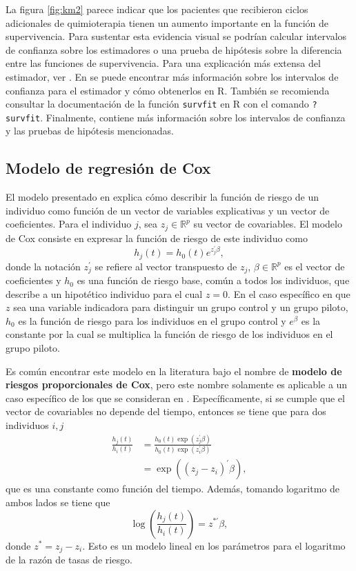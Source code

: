 \documentclass[11pt,a4paper]{article}
\begin{document}
La figura \ref{fig:km2} parece indicar que los pacientes que recibieron ciclos adicionales de quimioterapia tienen un aumento importante en la función de supervivencia. Para sustentar esta evidencia visual se podrían calcular intervalos de confianza sobre los estimadores o una prueba de hipótesis sobre la diferencia entre las funciones de supervivencia. Para una explicación más extensa del estimador, ver \citet{kaplan-meier}. En \citet{moore} se puede encontrar más información sobre los intervalos de confianza para el estimador y cómo obtenerlos en R. También se recomienda consultar la documentación de la función \texttt{survfit} en R con el comando \texttt{?survfit}. Finalmente, \citet{klein} contiene más información sobre los intervalos de confianza y las pruebas de hipótesis mencionadas.

\subsection{Modelo de regresión de Cox}
\label{seccion_coxph}
El modelo presentado en \citet{cox} explica cómo describir la función de riesgo de un individuo como función de un vector de variables explicativas y un vector de coeficientes. Para el individuo $j$, sea $z_j\in \mathbb{R}^p$ su vector de covariables. El modelo de Cox consiste en expresar la función de riesgo de este individuo como
\begin{equation} \label{cox_ph}
h_j(t) = h_0(t)e^{z_j^\prime \beta},
\end{equation}
donde la notación $z_j^\prime$ se refiere al vector transpuesto de $z_j$, $\beta\in \mathbb{R}^p$ es el vector de coeficientes y $h_0$ es una función de riesgo base, común a todos los individuos, que describe a un hipotético individuo para el cual $z = 0$. En el caso específico en que $z$ sea una variable indicadora para distinguir un grupo control y un grupo piloto, $h_0$ es la función de riesgo para los individuos en el grupo control y $e^\beta$ es la constante por la cual se multiplica la función de riesgo de los individuos en el grupo piloto.

Es común encontrar este modelo en la literatura bajo el nombre de \textbf{modelo de riesgos proporcionales de Cox}, pero este nombre solamente es aplicable a un caso específico de los que se consideran en \citet{cox}. Específicamente, si se cumple que el vector de covariables no depende del tiempo, entonces se tiene que para dos individuos $i, j$
\begin{align}
\label{eq:prop_haz}
\frac{h_j(t)}{h_i(t)} &= \frac{h_0(t)\exp (z_j^\prime \beta)}{h_0(t)\exp (z_i^\prime \beta)} \nonumber \\
&= \exp ((z_j-z_i)^\prime \beta),
\end{align}
que es una constante como función del tiempo. Además, tomando logaritmo de ambos lados se tiene que
$$\log \left(\frac{h_j(t)}{h_i(t)}\right) = z^{*\prime} \beta,$$ donde $z^* = z_j-z_i$. Esto es un modelo lineal en los parámetros para el logaritmo de la razón de tasas de riesgo.
\end{document}
